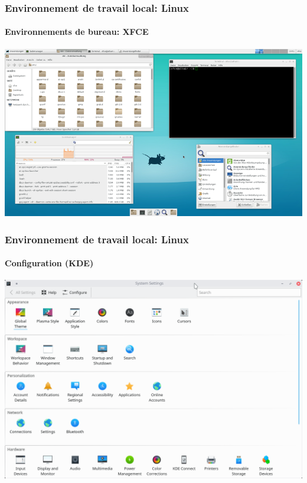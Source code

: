 \documentclass[xcolor=table]{beamer}
\begin{document}
\begin{frame}
\frametitle{Environnement de travail local: Linux}
\framesubtitle{Environnements de bureau: XFCE}

\begin{center}
	\includegraphics[height=
.8\textheight]{../img/Bweb01-environnement/xfce.png}
\end{center}

\end{frame}

\begin{frame}
\frametitle{Environnement de travail local: Linux}
\framesubtitle{Configuration (KDE)}

\begin{center}
	\includegraphics[height=
	.8\textheight]{../img/Bweb01-environnement/kde-config.png}
\end{center}

\end{frame}
\end{document}

